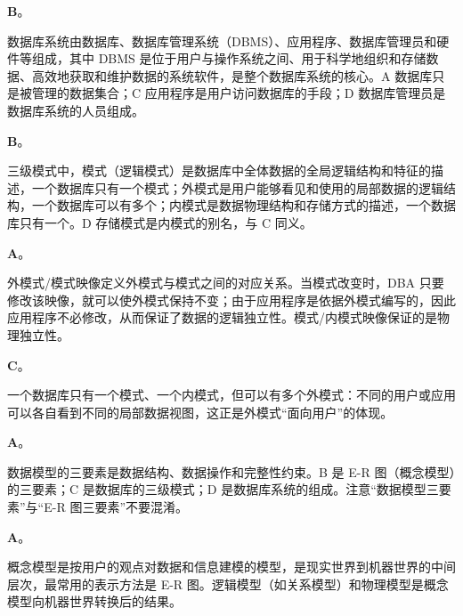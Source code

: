 \documentclass[a4paper,11pt]{article}
\begin{document}


\q \textbf{B}。\begin{analysis}数据库系统由数据库、数据库管理系统（DBMS）、应用程序、数据库管理员和硬件等组成，其中 DBMS 是位于用户与操作系统之间、用于科学地组织和存储数据、高效地获取和维护数据的系统软件，是整个数据库系统的核心。A 数据库只是被管理的数据集合；C 应用程序是用户访问数据库的手段；D 数据库管理员是数据库系统的人员组成。\end{analysis}

\q \textbf{B}。\begin{analysis}三级模式中，模式（逻辑模式）是数据库中全体数据的全局逻辑结构和特征的描述，一个数据库只有一个模式；外模式是用户能够看见和使用的局部数据的逻辑结构，一个数据库可以有多个；内模式是数据物理结构和存储方式的描述，一个数据库只有一个。D 存储模式是内模式的别名，与 C 同义。\end{analysis}

\q \textbf{A}。\begin{analysis}外模式/模式映像定义外模式与模式之间的对应关系。当模式改变时，DBA 只要修改该映像，就可以使外模式保持不变；由于应用程序是依据外模式编写的，因此应用程序不必修改，从而保证了数据的逻辑独立性。模式/内模式映像保证的是物理独立性。\end{analysis}

\q \textbf{C}。\begin{analysis}一个数据库只有一个模式、一个内模式，但可以有多个外模式：不同的用户或应用可以各自看到不同的局部数据视图，这正是外模式“面向用户”的体现。\end{analysis}

\q \textbf{A}。\begin{analysis}数据模型的三要素是数据结构、数据操作和完整性约束。B 是 E-R 图（概念模型）的三要素；C 是数据库的三级模式；D 是数据库系统的组成。注意“数据模型三要素”与“E-R 图三要素”不要混淆。\end{analysis}

\q \textbf{A}。\begin{analysis}概念模型是按用户的观点对数据和信息建模的模型，是现实世界到机器世界的中间层次，最常用的表示方法是 E-R 图。逻辑模型（如关系模型）和物理模型是概念模型向机器世界转换后的结果。\end{analysis}
\end{document}
